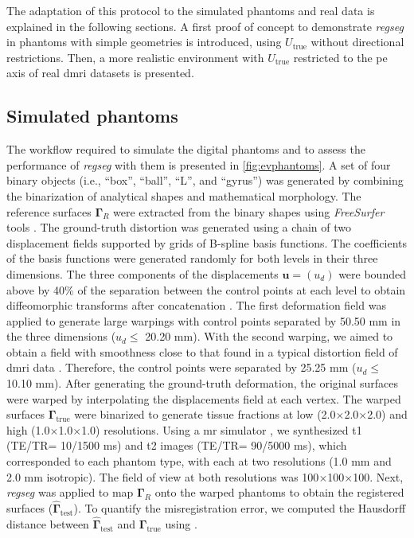 \documentclass[3p,authoryear,fleqn]{elsarticle}
\providecommand{\gammaset}{\ensuremath{\boldsymbol{\Gamma}}}
\providecommand{\regseg}{\emph{regseg}}
\renewcommand{\vec}[1]{\mathbf{#1}}
\providecommand{\isores}[2][]{#2\ensuremath{\times}#2\ensuremath{\times}#2\ifthenelse{\equal{#1}{}}{}{ [#1]}\xspace}
\begin{document}
The adaptation of this protocol to the simulated phantoms and real data is explained in the
  following sections.
A first proof of concept to demonstrate \regseg{} in phantoms with simple
  geometries is introduced, using $U_\text{true}$ without directional restrictions.
Then, a more realistic environment with $U_\text{true}$ restricted to the
  \gls*{pe} axis of real \gls*{dmri} datasets is presented.

\subsection{Simulated phantoms}\label{sec:digital_phantoms}
The workflow required to simulate the digital phantoms and to assess the performance of
  \regseg{} with them is presented in \autoref{fig:evphantoms}.
A set of four binary objects (i.e., ``box'', ``ball'', ``L'',
  and ``gyrus'') was generated by combining the binarization of
  analytical shapes and mathematical morphology.
The reference surfaces $\gammaset_R$ were extracted from the binary shapes
  using \emph{FreeSurfer} tools \citep{fischl_freesurfer_2012}.
The ground-truth distortion was generated using a chain of two displacement
  fields supported by grids of B-spline basis functions.
The coefficients of the basis functions were generated randomly for
  both levels in their three dimensions.
The three components of the displacements $\vec{u} = (u_d)$
  were bounded above by 40\% of the separation between the control points
  at each level to obtain diffeomorphic transforms
  after concatenation \citep{rueckert_diffeomorphic_2006}.
The first deformation field was applied to generate large warpings
  with control points separated by 50.50 mm in the three dimensions
  ($u_d\leq$ 20.20 mm).
With the second warping, we aimed to obtain a field with smoothness
  close to that found in a typical distortion field of \gls*{dmri} data
  \citep{irfanoglu_susceptibility_2011}.
Therefore, the control points were separated by 25.25 mm ($u_d\leq$ 10.10 mm).
After generating the ground-truth deformation, the original surfaces
  were warped by interpolating the displacements field at each vertex.
The warped surfaces $\gammaset_\text{true}$ were binarized to generate tissue fractions
  at low (\isores[mm]{2.0}) and high (\isores[mm]{1.0}) resolutions.
Using a \gls*{mr} simulator \citep{caruyer_phantomas_2014}, we synthesized
  \gls*{t1} (TE/TR= 10/1500 ms) and \gls*{t2} images (TE/TR= 90/5000 ms), which
  corresponded to each phantom type, with each at two resolutions
  (1.0 mm and 2.0 mm isotropic).
The field of view at both resolutions was \isores[mm]{100}.
Next, \regseg{} was applied to map $\gammaset_R$ onto the warped phantoms to
  obtain the registered surfaces ($\hat{\gammaset}_\text{test}$).
To quantify the misregistration error, we computed the Hausdorff distance between
 $\hat{\gammaset}_\text{test}$ and $\gammaset_\text{true}$ using \citep{commandeur_vtk_2011}.
\end{document}
